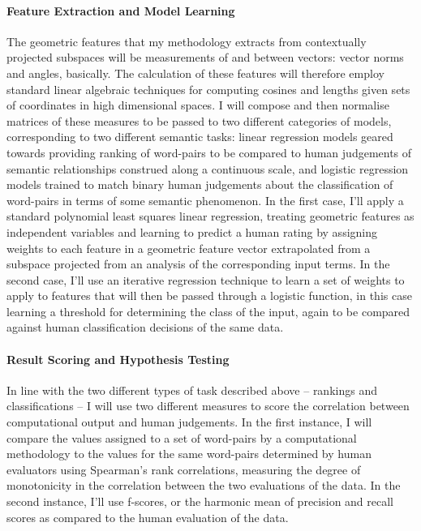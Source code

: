 \paragraph{Feature Extraction and Model Learning} The geometric features that my methodology extracts from contextually projected subspaces will be measurements of and between vectors: vector norms and angles, basically.  The calculation of these features will therefore employ standard linear algebraic techniques for computing cosines and lengths given sets of coordinates in high dimensional spaces.  I will compose and then normalise matrices of these measures to be passed to two different categories of models, corresponding to two different semantic tasks: linear regression models geared towards providing ranking of word-pairs to be compared to human judgements of semantic relationships construed along a continuous scale, and logistic regression models trained to match binary human judgements about the classification of word-pairs in terms of some semantic phenomenon.  In the first case, I'll apply a standard polynomial least squares linear regression, treating geometric features as independent variables and learning to predict a human rating by assigning weights to each feature in a geometric feature vector extrapolated from a subspace projected from an analysis of the corresponding input terms.  In the second case, I'll use an iterative regression technique to learn a set of weights to apply to features that will then be passed through a logistic function, in this case learning a threshold for determining the class of the input, again to be compared against human classification decisions of the same data.

\paragraph{Result Scoring and Hypothesis Testing} In line with the two different types of task described above -- rankings and classifications -- I will use two different measures to score the correlation between computational output and human judgements.  In the first instance, I will compare the values assigned to a set of word-pairs by a computational methodology to the values for the same word-pairs determined by human evaluators using Spearman's rank correlations, measuring the degree of monotonicity in the correlation between the two evaluations of the data.  In the second instance, I'll use f-scores, or the harmonic mean of precision and recall scores as compared to the human evaluation of the data.

